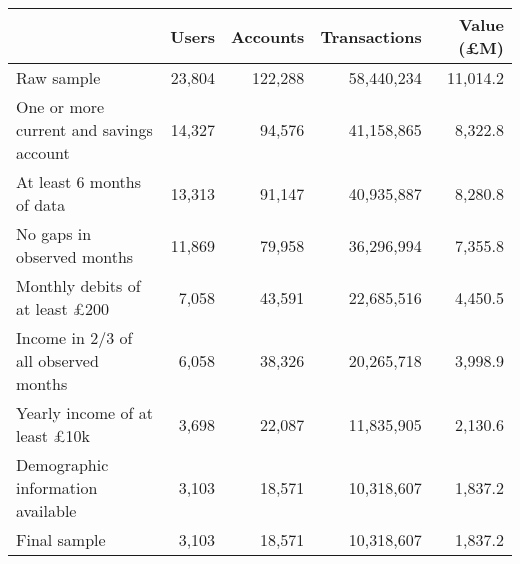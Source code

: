 \begin{tabular}{lrrrr}
\toprule
                                        &  Users & Accounts & Transactions & Value (\pounds M) \\
\midrule
                             Raw sample & 23,804 &  122,288 &   58,440,234 &          11,014.2 \\
One or more current and savings account & 14,327 &   94,576 &   41,158,865 &           8,322.8 \\
              At least 6 months of data & 13,313 &   91,147 &   40,935,887 &           8,280.8 \\
             No gaps in observed months & 11,869 &   79,958 &   36,296,994 &           7,355.8 \\
  Monthly debits of at least \pounds200 &  7,058 &   43,591 &   22,685,516 &           4,450.5 \\
   Income in 2/3 of all observed months &  6,058 &   38,326 &   20,265,718 &           3,998.9 \\
   Yearly income of at least \pounds10k &  3,698 &   22,087 &   11,835,905 &           2,130.6 \\
      Demographic information available &  3,103 &   18,571 &   10,318,607 &           1,837.2 \\
                           Final sample &  3,103 &   18,571 &   10,318,607 &           1,837.2 \\
\bottomrule
\end{tabular}
